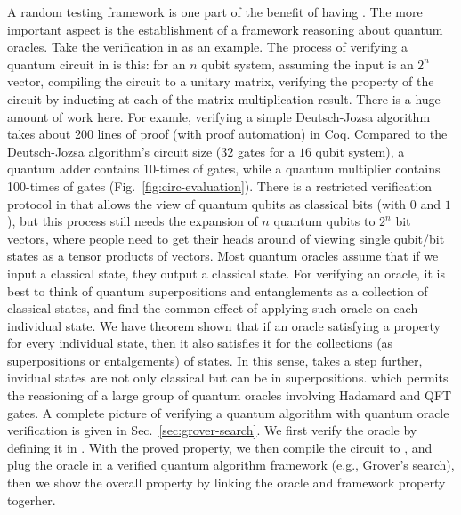 {A random testing framework is one part of the benefit of having \intlang. 
The more important aspect is the establishment of a framework reasoning about quantum oracles.
Take the verification in \sqir \cite{VOQC} as an example. 
The process of verifying a quantum circuit in \sqir is this: for an $n$ qubit system, assuming the input is an $2^n$ vector, compiling the circuit to a unitary matrix, verifying the property of the circuit by inducting at each of the matrix multiplication result.
There is a huge amount of work here. For examle, verifying a simple Deutsch-Jozsa algorithm takes about 200 lines of proof (with proof automation) in Coq. Compared to the Deutsch-Jozsa algorithm's circuit size ($32$ gates for a $16$ qubit system), a quantum adder contains 10-times of gates, while a quantum multiplier contains 100-times of gates (Fig.~\ref{fig:circ-evaluation}).
There is a restricted verification protocol in \sqir that allows the view of quantum qubits as classical bits (with $0$ and $1$), but this process still needs the expansion of $n$ quantum qubits to $2^n$ bit vectors, where people need to get their heads around of viewing single qubit/bit states as a tensor products of vectors.
Most quantum oracles assume that if we input a classical state, they output a classical state.
For verifying an oracle, it is best to think of quantum superpositions and entanglements as a collection of classical states, and find the common effect of applying such oracle on each individual state. 
We have theorem shown that if an oracle satisfying a property for every individual state, then it also satisfies it for the collections (as superpositions or entalgements) of states.
In this sense, \intlang takes a step further, invidual states are not only classical but can be in superpositions. which permits the reasioning of a large group of quantum oracles involving Hadamard and QFT gates.
A complete picture of verifying a quantum algorithm with quantum oracle verification is given in Sec.~\ref{sec:grover-search}.
We first verify the oracle by defining it in \intlang. With the proved property, we then compile the circuit to \sqir, and plug the oracle in a verified quantum algorithm framework (e.g., Grover's search), then we show the overall property by linking the oracle and framework property togerher. 
}
